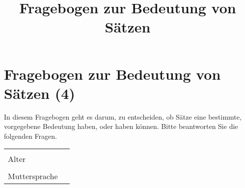\documentclass[a4paper, 8pt]{article}
\title{Fragebogen zur Bedeutung von Sätzen}
\begin{document}
\section*{Fragebogen zur Bedeutung von Sätzen (4)}

In diesem Fragebogen geht es darum, zu entscheiden, ob Sätze eine bestimmte, vorgegebene Bedeutung haben, oder haben können. Bitte beantworten Sie die folgenden Fragen.


\begin{tabular}{|l|p{5cm}|}
\hline
& \\
Alter & \\
\hline
& \\
Muttersprache & \\
\hline
\end{tabular}
\end{document}
